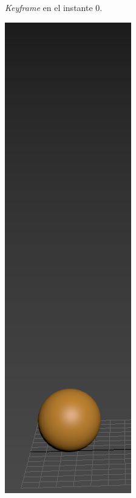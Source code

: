 \documentclass{article}
\begin{document}
\begin{figure}[H]
\begin{subfigure}[H]{0.15\textwidth}
	    \caption{\textit{Keyframe} en el instante 0.}
	\end{subfigure}
    \hfill
	\begin{subfigure}[H]{0.15\textwidth}
	    \centering
	    \includegraphics[width=\textwidth]{imagenes/Ejercicio 2/p1_12.png}

\end{subfigure}
\end{figure}
\end{document}

